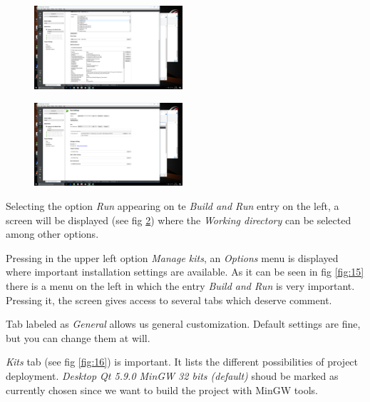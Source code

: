 \documentclass[a4paper,10pt]{article}
\begin{document}
\begin{minipage}{0.5\linewidth}
\begin{figure}[H]
\begin{center}
\includegraphics[width=5.5cm]{fig13.png}
\vspace*{-1mm}
\caption{\small  \label{fig:13}}
\end{center}
\end{figure}
\end{minipage}
\begin{minipage}{0.5\linewidth}
\begin{figure}[H]
\begin{center}
\includegraphics[width=5.5cm]{fig14.png}
\vspace*{-1mm}
\caption{\small  \label{fig:14}}
\end{center}
\end{figure}
\end{minipage}

Selecting the option {\it Run} appearing on te {\it Build and Run} entry on the left, 
a screen will be displayed (see fig \ref{fig:14}) where the {\it Working directory} can be selected among other options.

Pressing in the upper left option {\it Manage kits}, an {\it Options} menu is displayed where important installation settings
are available. As it can be seen in fig \ref{fig:15} there is a menu on the left in which the entry {\it Build and Run}
is very important. Pressing it, the screen gives access to several tabs which deserve comment.

Tab labeled as {\it General} allows us general customization. Default settings are fine, but you can
change them at will. 

{\it Kits} tab (see fig \ref{fig:16}) is important. It lists the different possibilities of project deployment.
{\it Desktop Qt 5.9.0 MinGW 32 bits (default)} shoud be marked as currently chosen 
since we want to build the project with MinGW tools.
\end{document}

